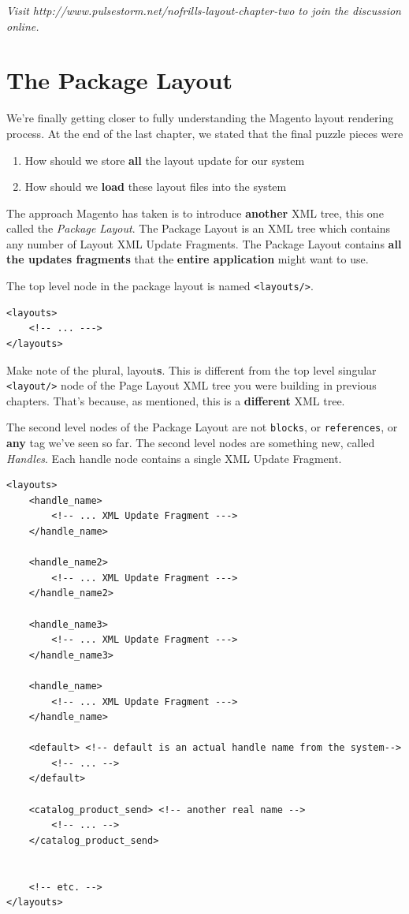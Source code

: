 \documentclass[oneside]{book}
\begin{document}
\emph{Visit http://www.pulsestorm.net/nofrills-layout-chapter-two to join the discussion online.}
\chapter{The Package Layout}
We're finally getting closer to fully understanding the Magento layout rendering process.  At the end of the last chapter, we stated that the final puzzle pieces were

\begin{enumerate}
\item How should we store \textbf{all} the layout update for our system
\item How should we \textbf{load} these layout files into the system
\end{enumerate}


The approach Magento has taken is to introduce \textbf{another} XML tree, this one called the \emph{Package Layout}.  The Package Layout is an XML tree which contains any number of Layout XML Update Fragments. The Package Layout contains \textbf{all the updates fragments} that the \textbf{entire application} might want to use.

The top level node in the package layout is named \footnotesize\texttt{\textless layouts/\textgreater }\normalsize.  

\begin{lstlisting}
<layouts>
    <!-- ... --->
</layouts>

\end{lstlisting}


Make note of the plural, layout\textbf{s}.  This is different from the top level singular  \footnotesize\texttt{\textless layout/\textgreater } \normalsize  node of the Page Layout XML tree you were building in previous chapters.  That's because, as mentioned, this is a \textbf{different} XML tree.

The second level nodes of the Package Layout are not \footnotesize\texttt{blocks}\normalsize, or \footnotesize\texttt{references}\normalsize, or \textbf{any} tag we've seen so far.  The second level nodes are something new, called \emph{Handles}.  Each handle node contains a single XML Update Fragment.

\begin{lstlisting}
<layouts>
    <handle_name>
        <!-- ... XML Update Fragment --->
    </handle_name>

    <handle_name2>
        <!-- ... XML Update Fragment --->
    </handle_name2>

    <handle_name3>
        <!-- ... XML Update Fragment --->
    </handle_name3>

    <handle_name>
        <!-- ... XML Update Fragment --->
    </handle_name>      

    <default> <!-- default is an actual handle name from the system-->
        <!-- ... -->
    </default>

    <catalog_product_send> <!-- another real name -->
        <!-- ... -->
    </catalog_product_send>


    <!-- etc. -->
</layouts>

\end{lstlisting}
\end{document}

